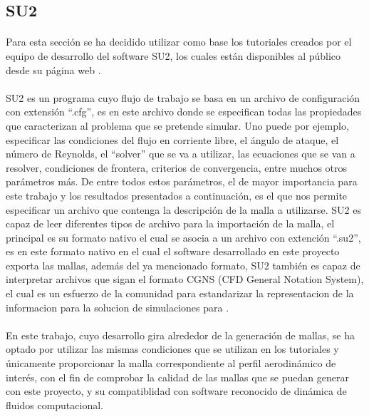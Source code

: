 \documentclass[letterpaper, openright, 12pt]{book}
\begin{document}
    \subsection{SU2}
    \paragraph*{}
    Para esta sección se ha decidido utilizar como base los tutoriales creados
    por el equipo de desarrollo del software SU2, los cuales están disponibles
    al público desde su página web \cite{SU2}.

    \paragraph*{}
    SU2 es un programa cuyo flujo de trabajo se basa en un archivo de
    configuración con extensión ``.cfg'', es en este archivo donde se
    especifican todas las propiedades que caracterizan al problema que se
    pretende simular. Uno puede por ejemplo, especificar las condiciones del
    flujo en corriente libre, el ángulo de ataque, el número de Reynolds, el
    ``solver'' que se va a utilizar, las ecuaciones que se van a resolver,
    condiciones de frontera, criterios de convergencia, entre muchos otros
    parámetros más. De entre todos estos parámetros, el de mayor importancia
    para este trabajo y los resultados presentados a continuación, es el que
    nos permite especificar un archivo que contenga la descripción de la malla
    a utilizarse. SU2 es capaz de leer diferentes tipos de archivo para la
    importación de la malla, el principal es su formato nativo el cual
    se asocia a un archivo con extención ``.su2'', es en este formato nativo en
    el cual el software desarrollado en este proyecto exporta las mallas,
    además del ya mencionado formato, SU2 también es capaz de interpretar
    archivos que sigan el formato CGNS (CFD General Notation System), el cual
    es un esfuerzo de la comunidad para estandarizar la representacion de la
    informacion para la solucion de simulaciones para \@DFC.

    \paragraph*{}
    En este trabajo, cuyo desarrollo gira alrededor de la generación de mallas,
    se ha optado por utilizar las mismas condiciones que se utilizan en los
    tutoriales y únicamente proporcionar la malla correspondiente al perfil
    aerodinámico de interés, con el fin de comprobar la calidad de las mallas
    que se puedan generar con este proyecto, y su compatiblidad con software
    reconocido de dinámica de fluidos computacional.
\end{document}
